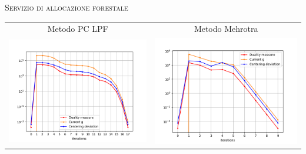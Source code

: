 \begin{frame}{\textsc{\LARGE \textcolor{iris}{Servizio di allocazione forestale}}}
	\centering
	\begin{tabular}{c@{}c}
		\small{Metodo PC LPF} & \small{Metodo Mehrotra} \\
		\includegraphics[scale = 0.33]{for_PCLPF}
		&\includegraphics[scale = 0.33]{for_MER}\\ 
	\end{tabular}
\end{frame}


